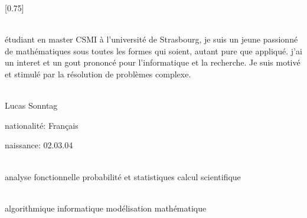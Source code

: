 \documentclass[verylight]{simplehipstercv}
\begin{document}
\setlength{\columnsep}{1.5cm}
[0.75]
\begin{paracol}{2}

\paracolbackgroundoptions



\footnotesize
{\setasidefontcolour
\flushright
\begin{center}
\end{center}

\\[0.5em]

{\footnotesize
étudiant en master CSMI à l'université de Strasbourg,
je suis un jeune passionné de mathématiques sous toutes les formes qui soient, autant pure que appliqué. j'ai un interet et un gout prononcé pour l'informatique et la recherche.
Je suis motivé et stimulé par la résolution de problèmes complexe.}
\bigskip

 \\[0.5em]
Lucas Sonntag   

nationalité: Français 

naissance: 02.03.04

\bigskip

 \\[0.5em]

analyse fonctionnelle
probabilité et statistiques
calcul scientifique


\bigskip



\bigskip

\\[0.5em]

algorithmique
informatique
modélisation mathématique


\bigskip


\vspace{4em}


\phantom{turn the page}


}
\switchcolumn

\small


\end{paracol}
\end{document}
